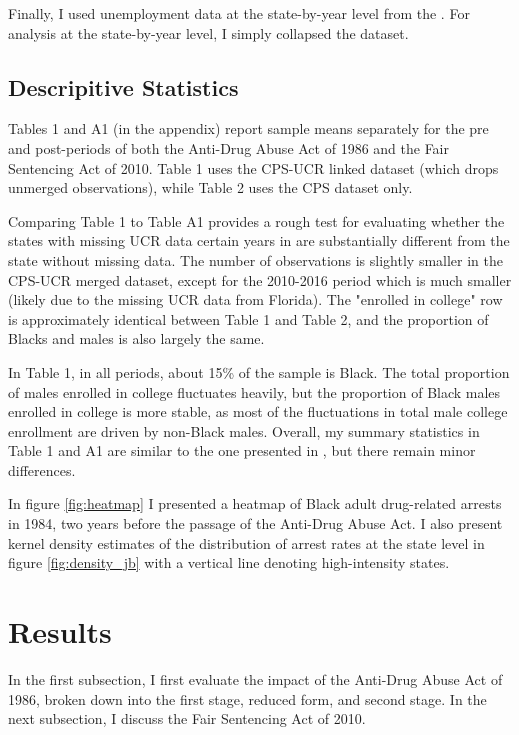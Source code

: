 \documentclass{article}
\begin{document}
Finally, I used unemployment data at the state-by-year level from the \cite{unemployment_data}. For analysis at the state-by-year level, I simply collapsed the dataset.

\subsection{Descripitive Statistics}

Tables 1 and A1 (in the appendix) report sample means separately for the pre and post-periods of both the Anti-Drug Abuse Act of 1986 and the Fair Sentencing Act of 2010. Table 1 uses the CPS-UCR linked dataset (which drops unmerged observations), while Table 2 uses the CPS dataset only. 

Comparing Table 1 to Table A1 provides a rough test for evaluating whether the states with missing UCR data certain years in are substantially different from the state without missing data. The number of observations is slightly smaller in the CPS-UCR merged dataset, except for the 2010-2016 period which is much smaller (likely due to the missing UCR data from Florida). The "enrolled in college" row is approximately identical between Table 1 and Table 2, and the proportion of Blacks and males is also largely the same.

In Table 1, in all periods, about 15\% of the sample is Black. The total proportion of males enrolled in college fluctuates heavily, but the proportion of Black males enrolled in college is more stable, as most of the fluctuations in total male college enrollment are driven by non-Black males. Overall, my summary statistics in Table 1 and A1 are similar to the one presented in \cite{britton2022}, but there remain minor differences.

In figure \ref{fig:heatmap} I presented a heatmap of Black adult drug-related arrests in 1984, two years before the passage of the Anti-Drug Abuse Act. I also present kernel density estimates of the distribution of arrest rates at the state level in figure \ref{fig:density_jb} with a vertical line denoting high-intensity states.

\section{Results}

In the first subsection, I first evaluate the impact of the Anti-Drug Abuse Act of 1986, broken down into the first stage, reduced form, and second stage. In the next subsection, I discuss the Fair Sentencing Act of 2010.
\end{document}
